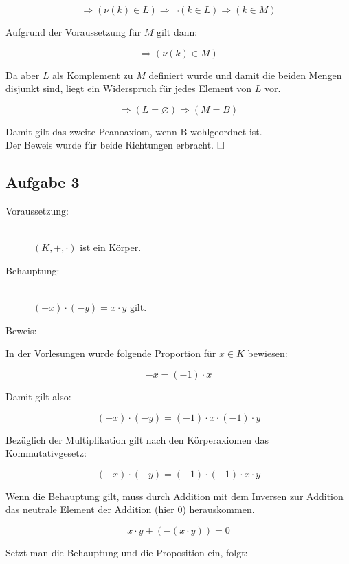 \documentclass[11pt, a4paper]{article}
\begin{document}
		\[ \Rightarrow (\nu(k) \in L) \Rightarrow \neg(k \in L) \Rightarrow (k \in M) \]

		Aufgrund der Voraussetzung für $M$ gilt dann:

		\[ \Rightarrow (\nu(k) \in M) \]

		Da aber $L$ als Komplement zu $M$ definiert wurde und damit die beiden Mengen disjunkt sind, liegt ein Widerspruch für jedes Element von $L$ vor.

		\[ \Rightarrow (L = \varnothing) \Rightarrow (M = B) \]

		Damit gilt das zweite Peanoaxiom, wenn B wohlgeordnet ist.\\

		Der Beweis wurde für beide Richtungen erbracht. $\hfill\Box$

		\newpage


	\subsection*{Aufgabe 3}

		\begin{description}
			\item[Voraussetzung:] \hfill \\
				$(K,+,\cdot)$ ist ein Körper. \hfill 

			\item[Behauptung:] \hfill \\
				$(-x)\cdot(-y) = x\cdot y$ gilt. \hfill 

			\item[Beweis:] 
		\end{description}

		In der Vorlesungen wurde folgende Proportion für $x \in K$ bewiesen:

		\[ -x = (-1) \cdot x \]

		Damit gilt also:

		\[ (-x)\cdot(-y) = (-1) \cdot x \cdot (-1) \cdot y \]

		Bezüglich der Multiplikation gilt nach den Körperaxiomen das Kommutativgesetz:

		\[ (-x)\cdot(-y) = (-1) \cdot (-1) \cdot x \cdot  y \]

		Wenn die Behauptung gilt, muss durch Addition mit dem Inversen zur Addition das neutrale Element der Addition (hier $0$) herauskommen.

		\[ x\cdot y + (-(x\cdot y)) = 0 \]

		Setzt man die Behauptung und die Proposition ein, folgt:
\end{document}
